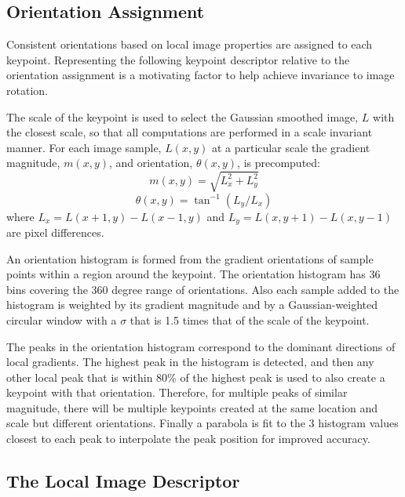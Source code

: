 \documentclass{article}
\begin{document}
\subsection{Orientation Assignment}\label{SS:OA}
Consistent orientations based on local image properties are assigned to each keypoint. 
Representing the following keypoint descriptor relative to the orientation assignment is a motivating factor to help achieve invariance to image rotation.  

The scale of the keypoint is used to select the Gaussian smoothed image, $L$ with the closest scale, so that all computations are performed in a scale invariant manner.  
For each image sample, $L(x,y)$ at a particular scale the gradient magnitude, $ m(x,y) $, and orientation, $ \theta(x,y) $, is precomputed: 
\begin{equation}
  m(x,y) = \sqrt{L_x^2 + L_y^2 }
\end{equation}
\begin{equation}
  \theta(x,y) = \tan^{-1}(L_y/L_x)
\end{equation}
where $ L_x = L(x+1,y)-L(x-1,y) $ and $ L_y = L(x,y+1)-L(x,y-1) $ are pixel differences. 

An orientation histogram is formed from the gradient orientations of sample points within a region around the keypoint.  The orientation histogram has 36 bins covering  the 360 degree range of orientations.  
Also each sample added to the histogram is weighted by its gradient magnitude and by a Gaussian-weighted circular window with a $\sigma$ that is 1.5 times that of the scale of the keypoint. 

The peaks in the orientation histogram correspond to the dominant directions of local gradients. 
The highest peak in the histogram is detected, and then any other local peak that is within 80\% of the highest peak is used to also create a keypoint with that orientation.  
Therefore, for multiple peaks of similar magnitude, there will be multiple keypoints created at the same location and scale but different orientations. 
Finally a parabola is fit to the 3 histogram values closest to each peak to interpolate the peak position for improved accuracy.


\subsection{The Local Image Descriptor}\label{SS:LID}
\end{document}
